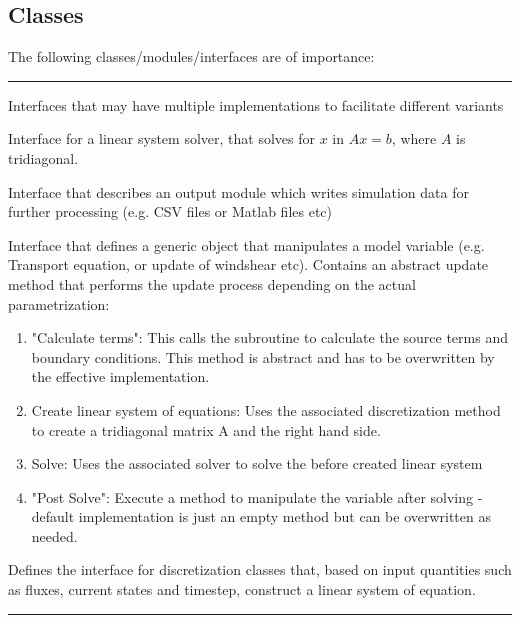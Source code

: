\documentclass[paper=a4, fontsize=12pt]{article}
\begin{document}
\newpage
\subsection{Classes}

The following classes/modules/interfaces are of importance:

\begin{description}[style=nextline]
	\vspace{1em}
	\hrule
	\item[Interfaces] \noindent Interfaces that may have multiple implementations to facilitate different variants
	
\begin{description}[style=multiline, leftmargin=17em]
		\item[LinSysSolver] Interface for a linear system solver, that solves for $x$ in $Ax=b$, where $A$ is tridiagonal.
		
		\item[SimstratOutputLogger] Interface that describes an output module which writes simulation data for further processing (e.g. CSV files or Matlab files etc)
		
		\item[ModelVariable] Interface that defines a generic object that manipulates a model variable (e.g. Transport equation, or update of windshear etc). Contains an abstract update method that performs the update process depending on the actual parametrization:
			\begin{enumerate}
				\item "Calculate terms": This calls the subroutine to calculate the source terms and boundary conditions. This method is abstract and has to be overwritten by the effective implementation.
				\item Create linear system of equations: Uses the associated discretization method to create a tridiagonal matrix A and the right hand side.
				\item Solve: Uses the associated solver to solve the before created linear system
				\item "Post Solve": Execute a method to manipulate the variable after solving - default implementation is just an empty method but can be overwritten as needed.
			
			\end{enumerate}


	\item[Discretization] Defines the interface for discretization classes that, based on input quantities such as fluxes, current states and timestep, construct a linear system of equation.
\end{description}
 \hrule
 

\end{description}
\end{document}
